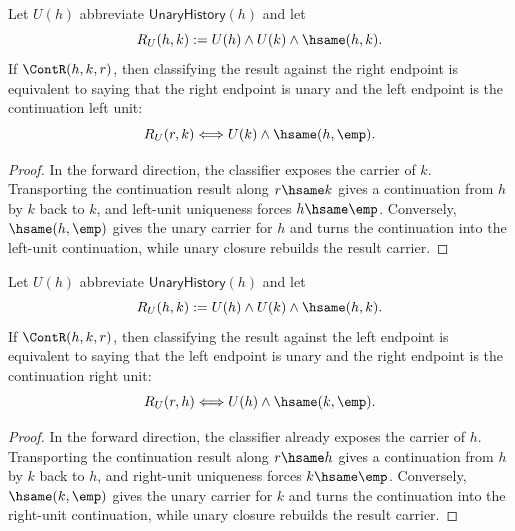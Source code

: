 \begin{theorem}
\label{thm:concrete-unary-history-magma-cont-left-unit-classifier}
Let $U(h)$ abbreviate $\mathsf{UnaryHistory}(h)$ and let
$$
R_U(h,k):=U(h)\land U(k)\land\hsame(h,k).
$$
If $\ContR(h,k,r)$, then classifying the result against the right endpoint is
equivalent to saying that the right endpoint is unary and the left endpoint is
the continuation left unit:
$$
R_U(r,k)
\Longleftrightarrow
U(k)\land\hsame(h,\emp).
$$
\end{theorem}
\begin{proof}
In the forward direction, the classifier exposes the carrier of $k$.
Transporting the continuation result along $r\hsame k$ gives a continuation
from $h$ by $k$ back to $k$, and left-unit uniqueness forces $h\hsame\emp$.
Conversely, $\hsame(h,\emp)$ gives the unary carrier for $h$ and turns the
continuation into the left-unit continuation, while unary closure rebuilds the
result carrier.
\end{proof}

\begin{theorem}
\label{thm:concrete-unary-history-magma-cont-right-unit-classifier}
Let $U(h)$ abbreviate $\mathsf{UnaryHistory}(h)$ and let
$$
R_U(h,k):=U(h)\land U(k)\land\hsame(h,k).
$$
If $\ContR(h,k,r)$, then classifying the result against the left endpoint is
equivalent to saying that the left endpoint is unary and the right endpoint is
the continuation right unit:
$$
R_U(r,h)
\Longleftrightarrow
U(h)\land\hsame(k,\emp).
$$
\end{theorem}
\begin{proof}
In the forward direction, the classifier already exposes the carrier of $h$.
Transporting the continuation result along $r\hsame h$ gives a continuation
from $h$ by $k$ back to $h$, and right-unit uniqueness forces $k\hsame\emp$.
Conversely, $\hsame(k,\emp)$ gives the unary carrier for $k$ and turns the
continuation into the right-unit continuation, while unary closure rebuilds
the result carrier.
\end{proof}

